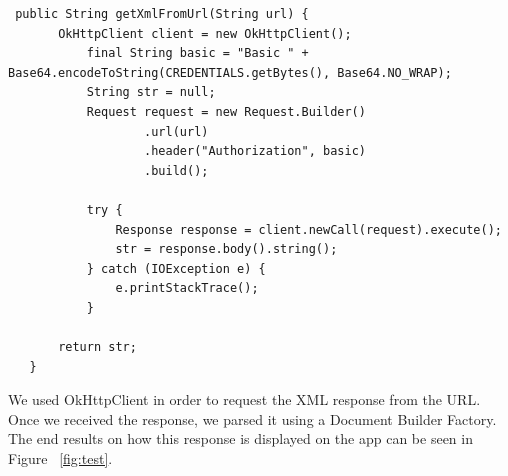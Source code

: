 \documentclass[letterpaper,10pt,draftclsnofoot,onecolumn,titlepage]{IEEEtran}
\begin{document}
		\begin{lstlisting}
 public String getXmlFromUrl(String url) {
       OkHttpClient client = new OkHttpClient();
           final String basic = "Basic " + Base64.encodeToString(CREDENTIALS.getBytes(), Base64.NO_WRAP);
           String str = null;
           Request request = new Request.Builder()
                   .url(url)
                   .header("Authorization", basic)
                   .build();

           try {
               Response response = client.newCall(request).execute();
               str = response.body().string();
           } catch (IOException e) {
               e.printStackTrace();
           }

       return str;
   }
   		\end{lstlisting}
		
		We used OkHttpClient in order to request the XML response from the URL. 
		Once we received the response, we parsed it using a Document Builder Factory. 
		The end results on how this response is displayed on the app can be seen in Figure ~\ref{fig:test}.
		
\end{document}

